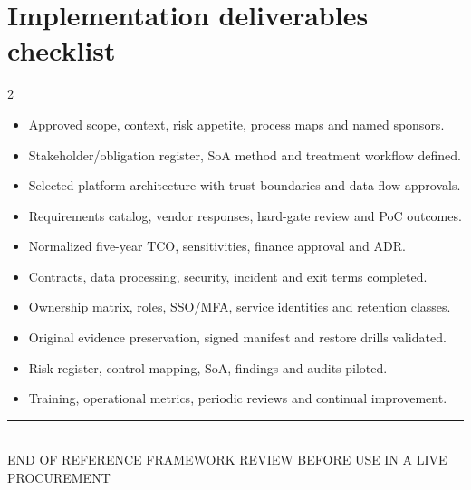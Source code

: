 \documentclass[10pt,letterpaper]{article}
\begin{document}
\section{Implementation deliverables checklist}
\begin{multicols}{2}
\footnotesize
\begin{itemize}[itemsep=1pt,parsep=0pt,leftmargin=1.40em]
\item[$\square$] Approved scope, context, risk appetite, process maps and named sponsors.
\item[$\square$] Stakeholder/obligation register, SoA method and treatment workflow defined.
\item[$\square$] Selected platform architecture with trust boundaries and data flow approvals.
\item[$\square$] Requirements catalog, vendor responses, hard-gate review and PoC outcomes.
\item[$\square$] Normalized five-year TCO, sensitivities, finance approval and ADR.
\item[$\square$] Contracts, data processing, security, incident and exit terms completed.
\item[$\square$] Ownership matrix, roles, SSO/MFA, service identities and retention classes.
\item[$\square$] Original evidence preservation, signed manifest and restore drills validated.
\item[$\square$] Risk register, control mapping, SoA, findings and audits piloted.
\item[$\square$] Training, operational metrics, periodic reviews and continual improvement.
\end{itemize}
\end{multicols}
\normalsize

\begin{center}
\color{teal}\rule{0.62\linewidth}{1pt}\\[1pt]
\sffamily\small\color{muted} END OF REFERENCE FRAMEWORK \quad\textbullet\quad REVIEW BEFORE USE IN A LIVE PROCUREMENT
\end{center}
\end{document}
